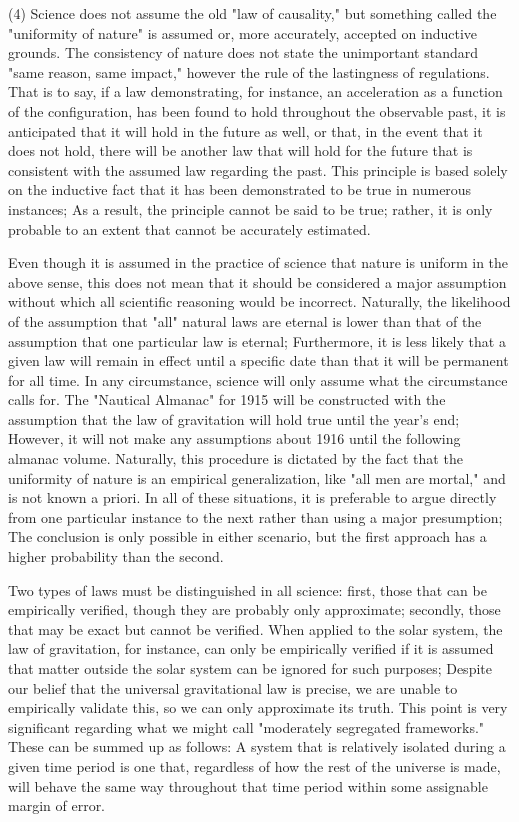 \documentclass[a4paper,12pt]{book}[2004/02/16]
\theoremstyle{ilemma}
\theoremstyle{itheorem}
\theoremstyle{iother}
\theoremstyle{icorollary}
\theoremstyle{numcorollary}
\theoremstyle{idefinition}
\begin{document}
(4) Science does not assume the old "law of causality," but something called the "uniformity of nature" is assumed or, more accurately, accepted on inductive grounds. The consistency of nature does
not state the unimportant standard "same reason, same impact," however the
rule of the lastingness of regulations. That is to say, if a law demonstrating, for instance, an acceleration as a function of the configuration, has been found to hold throughout the observable past, it is anticipated that it will hold in the future as well, or that, in the event that it does not hold, there will be another law that will hold for the future that is consistent with the assumed law regarding the past. This principle is based solely on the inductive fact that it has been demonstrated to be true in numerous instances; As a result, the principle cannot be said to be true; rather, it is only probable to an extent that cannot be accurately estimated.

Even though it is assumed in the practice of science that nature is uniform in the above sense, this does not mean that it should be considered a major assumption without which all scientific reasoning would be incorrect. Naturally, the likelihood of the assumption that "all" natural laws are eternal is lower than that of the assumption that one particular law is eternal; Furthermore, it is less likely that a given law will remain in effect until a specific date than that it will be permanent for all time. In any circumstance, science will only assume what the circumstance calls for. The "Nautical Almanac" for 1915 will be constructed with the assumption that the law of gravitation will hold true until the year's end; However, it will not make any assumptions about 1916 until the following almanac volume. Naturally, this procedure is dictated by the fact that the uniformity of nature is an empirical generalization, like "all men are mortal," and is not known a priori. In all of these situations, it is preferable to argue directly from one particular instance to the next rather than using a major presumption; The conclusion is only possible in either scenario, but the first approach has a higher probability than the second.

Two types of laws must be distinguished in all science: first, those that can be empirically verified, though they are probably only approximate;
secondly, those that may be exact but cannot be verified. When applied to the solar system, the law of gravitation, for instance, can only be empirically verified if it is assumed that matter outside the solar system can be ignored for such purposes; Despite our belief that the universal gravitational law is precise, we are unable to empirically validate this, so we can only approximate its truth. This point is very
significant regarding what we might call "moderately segregated
frameworks." These can be summed up as follows: A system that is relatively isolated during a given time period is one that, regardless of how the rest of the universe is made, will behave the same way throughout that time period within some assignable margin of error.
\end{document}
